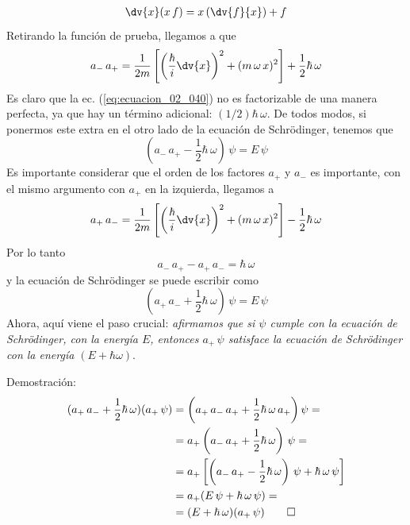 \begin{align*}
\dv{x} (x \, f) = x \left( \dv{f}{x} \right) + f
\end{align*}
Retirando la función de prueba, llegamos a que
\begin{equation}
a_{-} \, a_{+} = \dfrac{1}{2 m} \left[ \left( \dfrac{\hbar}{i} \dv{x} \right)^{2} + (m \, \omega \, x)^{2} \right] + \dfrac{1}{2} \hbar \, \omega
\label{eq:ecuacion_02_042}
\end{equation}
Es claro que la ec. (\ref{eq:ecuacion_02_040}) no es factorizable de una manera perfecta, ya que hay un término adicional: $(1/2) \hbar \, \omega$. De todos modos, si ponermos este extra en el otro lado de la ecuación de Schrödinger, tenemos que
\begin{equation}
(a_{-} \, a_{+} - \dfrac{1}{2} \hbar \, \omega) \, \psi = E \, \psi
\label{eq:ecuacion_02_43}
\end{equation}
Es importante considerar que el orden de los factores $a_{+}$ y $a_{-}$ es importante, con el mismo argumento con $a_{+}$ en la izquierda, llegamos a
\begin{equation}
a_{+} \, a_{-} = \dfrac{1}{2 m} \left[ \left( \dfrac{\hbar}{i} \dv{x} \right)^{2} + (m \, \omega \, x)^{2} \right] - \dfrac{1}{2} \hbar \, \omega
\label{eq:ecuacion_02_044}
\end{equation}
Por lo tanto
\begin{equation}
a_{-} \, a_{+} - a_{+} \, a_{-} = \hbar \, \omega
\label{eq:ecuacion_02_045}
\end{equation}
y la ecuación de Schrödinger se puede escribir como
\begin{equation}
(a_{+} \, a_{-} + \dfrac{1}{2} \hbar \, \omega) \, \psi = E \, \psi
\label{eq:ecuacion_02_046}
\end{equation}
Ahora, aquí viene el paso crucial: \emph{afirmamos que si $\psi$ cumple con la ecuación de Schrödinger, con la energía $E$, entonces $a_{+} \, \psi$ satisface la ecuación de Schrödinger con la energía $(E + \hbar \omega)$}.
\par
Demostración:
\begin{align*}
(a_{+} \, a_{-} + \dfrac{1}{2} \hbar \, \omega) (a_{+} \, \psi) &= \left( a_{+} \, a_{-} \, a_{+} + \dfrac{1}{2} \hbar \, \omega \, a_{+} \right) \psi = \\
&= a_{+} \left( a_{-} \, a_{+} + \dfrac{1}{2} \hbar \, \omega \right) \, \psi = \\
&= a_{+} \left[ \left( a_{-} \, a_{+} - \dfrac{1}{2} \hbar \, \omega \right) \, \psi + \hbar \, \omega \, \psi \right] \\
&= a_{+} (E \, \psi + \hbar \, \omega \, \psi) = \\
&= (E + \hbar \, \omega) (a_{+} \, \psi) \qed
\end{align*}
